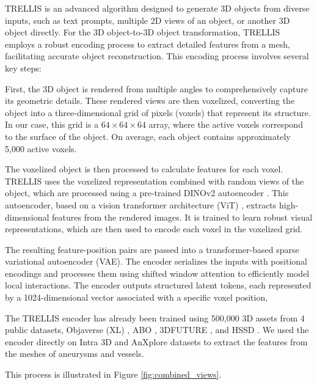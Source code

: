 \documentclass[%
 reprint,
 amsmath,amssymb,
 aps,
 floatfix,
 nofootinbib,
]{revtex4-2}
\begin{document}
TRELLIS \citep{xiang2024structured} is an advanced algorithm designed to generate 3D objects from diverse inputs, such as text prompts, multiple 2D views of an object, or another 3D object directly. For the 3D object-to-3D object transformation, TRELLIS employs a robust encoding process to extract detailed features from a mesh, facilitating accurate object reconstruction. This encoding process involves several key steps:

First, the 3D object is rendered from multiple angles to comprehensively capture its geometric details. These rendered views are then voxelized, converting the object into a three-dimensional grid of pixels (voxels) that represent its structure. In our case, this grid is a $64 \times 64 \times 64$ array, where the active voxels correspond to the surface of the object. On average, each object contains approximately 5,000 active voxels.

The voxelized object is then processed to calculate features for each voxel. TRELLIS uses the voxelized representation combined with random views of the object, which are processed using a pre-trained DINOv2 autoencoder \citep{oquab2024dinov2learningrobustvisual}. This autoencoder, based on a vision transformer architecture (ViT) \citep{dosovitskiy2021imageworth16x16words}, extracts high-dimensional features from the rendered images. It is trained to learn robust visual representations, which are then used to encode each voxel in the voxelized grid.

The resulting feature-position pairs are passed into a transformer-based sparse variational autoencoder (VAE). The encoder serializes the inputs with positional encodings and processes them using shifted window attention to efficiently model local interactions. The encoder outputs structured latent tokens, each represented by a 1024-dimensional vector associated with a specific voxel position,

The TRELLIS encoder has already been trained using 500,000 3D assets from 4 public datasets, Objaverse (XL) \citep{deitke2023objaversexluniverse10m3d} , ABO \citep{collins2022abodatasetbenchmarksrealworld}, 3DFUTURE \citep{fu20203dfuture3dfurnitureshape}, and HSSD \citep{khanna2023habitatsyntheticscenesdataset}. We used the encoder directly on Intra 3D \citep{yang2020intra} and AnXplore \citep{anxplore} datasets to extract the features from the meshes of aneurysms and vessels.  

This process is illustrated in Figure \ref{fig:combined_views}.
\end{document}
